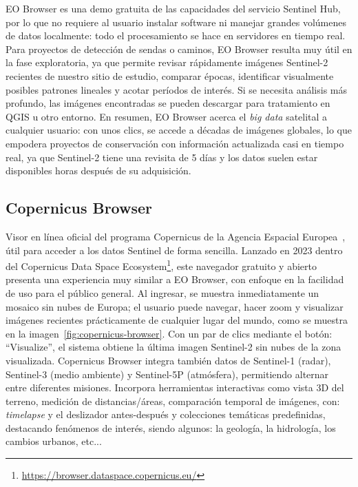 EO Browser es una demo gratuita de las capacidades del servicio Sentinel Hub, por lo que no requiere al usuario instalar software ni manejar grandes volúmenes de datos localmente: todo el procesamiento se hace en servidores en tiempo real. Para proyectos de detección de sendas o caminos, EO Browser resulta muy útil en la fase exploratoria, ya que permite revisar rápidamente imágenes Sentinel-2 recientes de nuestro sitio de estudio, comparar épocas, identificar visualmente posibles patrones lineales y acotar períodos de interés. Si se necesita análisis más profundo, las imágenes encontradas se pueden descargar para tratamiento en QGIS u otro entorno. En resumen, EO Browser acerca el \textit{big data} satelital a cualquier usuario: con unos clics, se accede a décadas de imágenes globales, lo que empodera proyectos de conservación con información actualizada casi en tiempo real, ya que Sentinel-2 tiene una revisita de 5 días y los datos suelen estar disponibles horas después de su adquisición.

\subsection{Copernicus Browser}

Visor en línea oficial del programa Copernicus de la Agencia Espacial Europea~\cite{copernicus_browser_web}, útil para acceder a los datos Sentinel de forma sencilla. Lanzado en 2023 dentro del Copernicus Data Space Ecosystem\footnote{\url{https://browser.dataspace.copernicus.eu/}}, este navegador gratuito y abierto presenta una experiencia muy similar a EO Browser, con enfoque en la facilidad de uso para el público general. Al ingresar, se muestra inmediatamente un mosaico sin nubes de Europa; el usuario puede navegar, hacer zoom y visualizar imágenes recientes prácticamente de cualquier lugar del mundo, como se muestra en la imagen~\ref{fig:copernicus-browser}. Con un par de clics mediante el botón: “Visualize”, el sistema obtiene la última imagen Sentinel-2 sin nubes de la zona visualizada. Copernicus Browser integra también datos de Sentinel-1 (radar), Sentinel-3 (medio ambiente) y Sentinel-5P (atmósfera), permitiendo alternar entre diferentes misiones. Incorpora herramientas interactivas como vista 3D del terreno, medición de distancias/áreas, comparación temporal de imágenes, con: \textit{timelapse} y el deslizador antes-después y colecciones temáticas predefinidas, destacando fenómenos de interés, siendo algunos: la geología, la hidrología, los cambios urbanos, etc...

